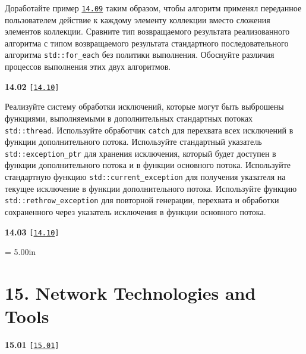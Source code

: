 \documentclass[a4paper,12pt]{article}
\begin{document}
\bigskip

Доработайте пример \href{https://github.com/i-s-m-mipt/Education/blob/master/projects/examples/source/14.09.cpp}{\texttt{14.09}} таким образом, чтобы алгоритм применял переданное пользователем действие к каждому элементу коллекции вместо сложения элементов коллекции. Сравните тип возвращаемого результата реализованного алгоритма с типом возвращаемого результата стандартного последовательного алгоритма \lstinline{std::for_each} без политики выполнения. Обоснуйте различия процессов выполнения этих двух алгоритмов.

\bigskip

{\large \textbf{14.02} \texttt{[\href{https://github.com/i-s-m-mipt/Education/blob/master/projects/examples/source/14.10.cpp}{\texttt{14.10}}]}}

\bigskip

Реализуйте систему обработки исключений, которые могут быть выброшены функциями, выполняемыми в дополнительных стандартных потоках \lstinline{std::thread}. Используйте обработчик \lstinline{catch} для перехвата всех исключений в функции дополнительного потока. Используйте стандартный указатель \lstinline{std::exception_ptr} для хранения исключения, который будет доступен в функции дополнительного потока и в функции основного потока. Используйте стандартную функцию \lstinline{std::current_exception} для получения указателя на текущее исключение в функции дополнительного потока. Используйте функцию \lstinline{std::rethrow_exception} для повторной генерации, перехвата и обработки сохраненного через указатель исключения в функции основного потока.

\bigskip

{\large \textbf{14.03} \texttt{[\href{https://github.com/i-s-m-mipt/Education/blob/master/projects/examples/source/14.10.cpp}{\texttt{14.10}}]}}

\bigskip





\newpage\thispagestyle{empty}\pdfpageheight = 5.00in\enlargethispage{100in}

\section{15. Network Technologies and Tools}

{\large \textbf{15.01} \texttt{[\href{https://github.com/i-s-m-mipt/Education/blob/master/projects/examples/source/15.01.cpp}{\texttt{15.01}}]}}
\end{document}
